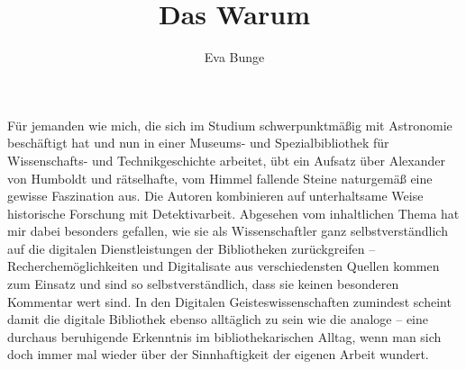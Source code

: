 \documentclass[output=paper]{langsci/langscibook}
\title{Das Warum}
\author{Eva Bunge}
\begin{document}
\maketitle

\noindent Für jemanden wie mich, die sich im Studium schwerpunktmäßig mit Astronomie beschäftigt hat und nun in einer Museums- und Spezialbibliothek für Wissenschafts- und Technikgeschichte arbeitet, übt ein Aufsatz über Alexander von Humboldt und rätselhafte, vom Himmel fallende Steine naturgemäß eine gewisse Faszination aus. Die Autoren kombinieren auf unterhaltsame Weise historische Forschung mit Detektivarbeit. Abgesehen vom inhaltlichen Thema hat mir dabei besonders gefallen, wie sie als Wissenschaftler ganz selbstverständlich auf die digitalen Dienstleistungen der Bibliotheken zurückgreifen – Recherchemöglichkeiten und Digitalisate aus verschiedensten Quellen kommen zum Einsatz und sind so selbstverständlich, dass sie keinen besonderen Kommentar wert sind. In den Digitalen Geisteswissenschaften zumindest scheint damit die digitale Bibliothek ebenso alltäglich zu sein wie die analoge – eine durchaus beruhigende Erkenntnis im bibliothekarischen Alltag, wenn man sich doch immer mal wieder über der Sinnhaftigkeit der eigenen Arbeit wundert.
\end{document}

